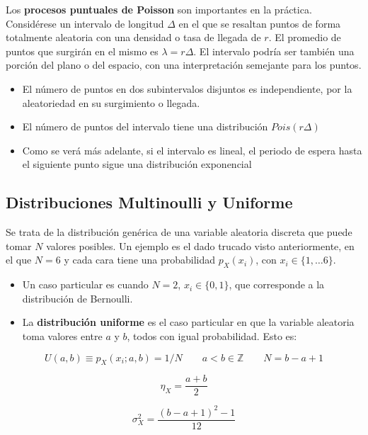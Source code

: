 \documentclass[11pt]{article}
\providecommand{\tightlist}{%
      \setlength{\itemsep}{0pt}\setlength{\parskip}{0pt}}
\begin{document}
    Los \textbf{procesos puntuales de Poisson} son importantes en la
práctica. Considérese un intervalo de longitud \(\Delta\) en el que se
resaltan puntos de forma totalmente aleatoria con una densidad o tasa de
llegada de \(r\). El promedio de puntos que surgirán en el mismo es
\(\lambda = r\Delta\). El intervalo podría ser también una porción del
plano o del espacio, con una interpretación semejante para los puntos.

\begin{itemize}
\tightlist
\item
  El número de puntos en dos subintervalos disjuntos es independiente,
  por la aleatoriedad en su surgimiento o llegada.
\item
  El número de puntos del intervalo tiene una distribución
  \(Pois(r\Delta)\)
\item
  Como se verá más adelante, si el intervalo es lineal, el periodo de
  espera hasta el siguiente punto sigue una distribución exponencial
\end{itemize}

    \hypertarget{distribuciones-multinoulli-y-uniforme}{%
\subsection*{Distribuciones Multinoulli y
Uniforme}\label{distribuciones-multinoulli-y-uniforme}}

Se trata de la distribución genérica de una variable aleatoria discreta
que puede tomar \(N\) valores posibles. Un ejemplo es el dado trucado
visto anteriormente, en el que \(N=6\) y cada cara tiene una
probabilidad \(p_X(x_i)\), con \(x_i \in \{1, \ldots 6\}\).

\begin{itemize}
\tightlist
\item
  Un caso particular es cuando \(N=2\), \(x_i \in \{0,1\}\), que
  corresponde a la distribución de Bernoulli.
\item
  La \textbf{distribución uniforme} es el caso particular en que la
  variable aleatoria toma valores entre \(a\) y \(b\), todos con igual
  probabilidad. Esto es:
\end{itemize}

\[U(a,b)\equiv p_X(x_i;a,b)=1/N \qquad a < b \in \mathbb{Z} \qquad N=b-a+1\]

\[\eta_X = \frac{a+b}{2}\]

\[\sigma_X^2 = \frac{(b-a+1)^2-1}{12}\]

    \begin{center}
    \end{center}
    { \hspace*{\fill} \\}
    
\end{document}
